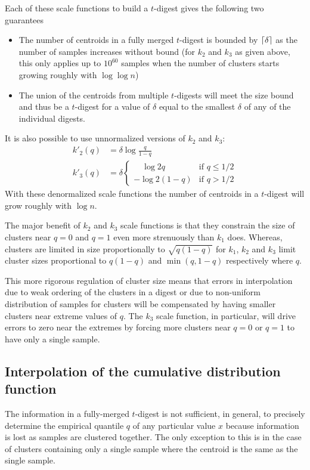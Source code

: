 \documentclass[]{statsoc}
\DeclarePairedDelimiter{\ceil}{\lceil}{\rceil}
\begin{document}
Each of these scale functions to build a $t$-digest gives the following two guarantees
\begin{itemize}
\item
The number of centroids in a fully merged $t$-digest is bounded by $\ceil\delta$ as the number of samples increases without bound (for $k_2$ and $k_3$ as given above, this only applies up to $10^{60}$ samples when the number of clusters starts growing roughly with $\log \log n$)
\item
The union of the centroids from multiple $t$-digests will meet the size bound and thus be a $t$-digest for a value of $\delta$ equal to the smallest $\delta$ of any of the individual digests.
\end{itemize}

It is also possible to use unnormalized versions of $k_2$ and $k_3$:
\begin{align}
k'_2(q) &=  \delta  \log {\frac q {1-q}} \\
k'_3(q) &=  \delta \begin{cases}
\quad \log 2q & \text{if  } q \le 1/2 \\
- \log 2(1-q) & \text{if  } q > 1/2
\end{cases}
\end{align}
With these denormalized scale functions the number of centroids in a $t$-digest will grow roughly with $\log n$.

The major benefit of $k_2$ and $k_3$ scale functions is that they constrain the size of clusters near $q=0$ and $q=1$ even more strenuously than $k_1$ does. Whereas, clusters are limited in size proportionally to $\sqrt {q (1-q)}$ for $k_1$, $k_2$ and $k_3$ limit cluster sizes proportional to $q(1-q)$ and $\min(q,1-q)$ respectively where $q$.

This more rigorous regulation of cluster size means that errors in interpolation due to weak ordering of the clusters in a digest or due to non-uniform distribution of samples for clusters will be compensated by having smaller clusters near extreme values of $q$. The $k_3$ scale function, in particular, will drive errors to zero near the extremes by forcing more clusters near $q=0$ or $q=1$ to have only a single sample.

\subsection{Interpolation of the cumulative distribution function}
The information in a fully-merged $t$-digest is not sufficient, in general, to precisely determine the empirical quantile $q$ of any particular value $x$ because information is lost as samples are clustered together. The only exception to this is in the case of clusters containing only a single sample where the centroid is the same as the single sample.
\end{document}
